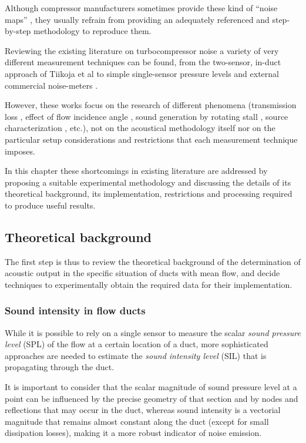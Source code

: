 Although compressor manufacturers sometimes provide these kind of ``noise maps'' \cite{gaude2008experimental}, they usually refrain from providing an adequately referenced and step-by-step methodology to reproduce them.

Reviewing the existing literature on turbocompressor noise a variety of very different measurement techniques can be found, from the two-sensor, in-duct approach of Tiikoja et al \cite{tiikoja2011inves} to simple single-sensor pressure levels and external commercial noise-meters \cite{figurella2012noise}.

However, these works focus on the research of different phenomena (transmission loss \cite{tiikoja2011inves}, effect of flow incidence angle \cite{figurella2012noise}, sound generation by rotating stall \cite{mongeau1993sound}, source characterization \cite{mongeau1995method}, etc.), not on the acoustical methodology itself nor on the particular setup considerations and restrictions that each measurement technique imposes.

In this chapter these shortcomings in existing literature are addressed by proposing a suitable experimental methodology and discussing the details of its theoretical background, its implementation, restrictions and processing required to produce useful results.

\subsection{Theoretical background}
\label{sec:theory}

The first step is thus to review the theoretical background of the determination of acoustic output in the specific situation of ducts with mean flow, and decide techniques to experimentally obtain the required data for their implementation.

\subsubsection{Sound intensity in flow ducts}
\label{sub:sound_intensity_in_flow_ducts}

While it is possible \cite{figurella2012noise} to rely on a single sensor to measure the scalar \emph{sound pressure level} (SPL) of the flow at a certain location of a duct, more sophisticated approaches are needed to estimate the \emph{sound intensity level} (SIL) that is propagating through the duct.

It is important to consider that the scalar magnitude of sound pressure level at a point can be influenced by the precise geometry of that section and by nodes and reflections that may occur in the duct, whereas sound intensity is a vectorial magnitude that remains almost constant along the duct (except for small dissipation losses), making it a more robust indicator of noise emission.

